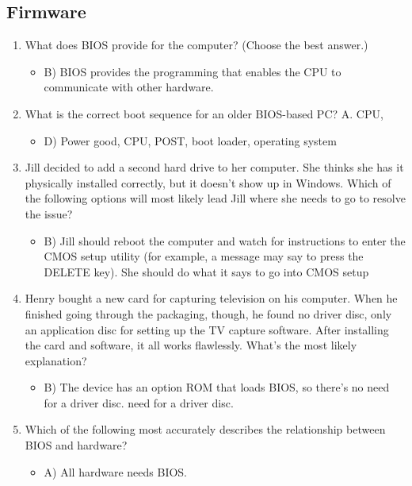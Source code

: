 \documentclass{article}
\begin{document}
\subsection{Firmware} 
\begin{enumerate}
    \item What does BIOS provide for the computer? (Choose the best answer.)
    \begin{itemize}
        \item B) BIOS provides the programming that enables the CPU to
communicate with other hardware. 
    \end{itemize}
    \item What is the correct boot sequence for an older BIOS-based PC?
A. CPU,
    \begin{itemize}
        \item D) Power good, CPU, POST, boot loader, operating system 
    \end{itemize}
    \item Jill decided to add a second hard drive to her computer. She thinks
she has it physically installed correctly, but it doesn’t show up in
Windows. Which of the following options will most likely lead Jill
where she needs to go to resolve the issue?
    \begin{itemize}
        \item B) Jill should reboot the computer and watch for instructions to enter
the CMOS setup utility (for example, a message may say to press the
DELETE key). She should do what it says to go into CMOS setup
    \end{itemize}
    \item Henry bought a new card for capturing television on his computer.
When he finished going through the packaging, though, he found no
driver disc, only an application disc for setting up the TV capture
software. After installing the card and software, it all works
flawlessly. What’s the most likely explanation?
    \begin{itemize}
        \item B) The device has an option ROM that loads BIOS, so there’s no
need for a driver disc.
need for a driver disc. 
    \end{itemize}
    \item Which of the following most accurately describes the relationship
between BIOS and hardware?
    \begin{itemize}
        \item A) All hardware needs BIOS. 
    \end{itemize}

\end{enumerate}
\end{document}
